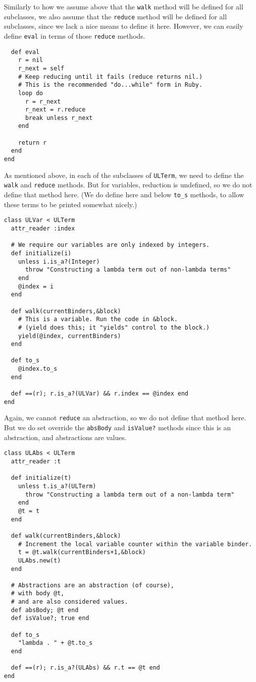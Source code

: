 \documentclass[11pt]{article}
\theoremstyle{definition}
\begin{document}
Similarly to how we assume above that the \texttt{walk} method
will be defined for all subclasses, we also assume
that the \texttt{reduce} method will be defined for all subclasses,
since we lack a nice means to define it here.
However, we can easily define \texttt{eval} in terms of those \texttt{reduce} methods.
\begin{verbatim}
  def eval
    r = nil
    r_next = self
    # Keep reducing until it fails (reduce returns nil.)
    # This is the recommended "do...while" form in Ruby.
    loop do
      r = r_next
      r_next = r.reduce
      break unless r_next
    end

    return r
  end
end
\end{verbatim}

As mentioned above, in each of the subclasses of \texttt{ULTerm},
we need to define the \texttt{walk} and \texttt{reduce} methods.
But for variables, reduction is undefined, so we
do not define that method here.
(We do define here and below \texttt{to\_s} methods, to allow
these terms to be printed somewhat nicely.)
\begin{verbatim}
class ULVar < ULTerm
  attr_reader :index

  # We require our variables are only indexed by integers.
  def initialize(i)
    unless i.is_a?(Integer)
      throw "Constructing a lambda term out of non-lambda terms"
    end
    @index = i
  end
  
  def walk(currentBinders,&block)
    # This is a variable. Run the code in &block.
    # (yield does this; it "yields" control to the block.)
    yield(@index, currentBinders)
  end

  def to_s
    @index.to_s
  end

  def ==(r); r.is_a?(ULVar) && r.index == @index end
end
\end{verbatim}

Again, we cannot \texttt{reduce} an abstraction,
so we do not define that method here.
But we do set override the \texttt{absBody} and \texttt{isValue?} methods
since this is an abstraction, and abstractions are values.
\begin{verbatim}
class ULAbs < ULTerm
  attr_reader :t

  def initialize(t)
    unless t.is_a?(ULTerm)
      throw "Constructing a lambda term out of a non-lambda term"
    end
    @t = t
  end
  
  def walk(currentBinders,&block)
    # Increment the local variable counter within the variable binder.
    t = @t.walk(currentBinders+1,&block)
    ULAbs.new(t)
  end

  # Abstractions are an abstraction (of course),
  # with body @t,
  # and are also considered values.
  def absBody; @t end
  def isValue?; true end
  
  def to_s
    "lambda . " + @t.to_s
  end

  def ==(r); r.is_a?(ULAbs) && r.t == @t end
end
\end{verbatim}
\end{document}

